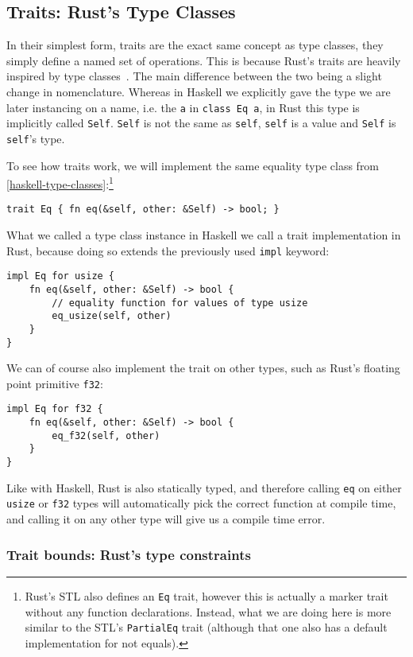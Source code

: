 \subsection{Traits: Rust's Type Classes}

In their simplest form, traits are the exact same concept as type classes, they simply define a named set of operations. This is because Rust's traits are heavily inspired by type classes~\cite{rust-reference}. The main difference between the two being a slight change in nomenclature. Whereas in Haskell we explicitly gave the type we are later instancing on a name, i.e. the \verb|a| in \verb|class Eq a|, in Rust this type is implicitly called \verb|Self|. \verb|Self| is not the same as \verb|self|, \verb|self| is a value and \verb|Self| is \verb|self|'s type.

To see how traits work, we will implement the same equality type class from \autoref{haskell-type-classes}:\footnote{Rust's STL also defines an \verb|Eq| trait, however this is actually a marker trait without any function declarations. Instead, what we are doing here is more similar to the STL's \verb|PartialEq| trait (although that one also has a default implementation for not equals).}
\begin{verbatim}
trait Eq { fn eq(&self, other: &Self) -> bool; }
\end{verbatim}
What we called a type class instance in Haskell we call a trait implementation in Rust, because doing so extends the previously used \verb|impl| keyword:
\begin{verbatim}
impl Eq for usize {
    fn eq(&self, other: &Self) -> bool {
        // equality function for values of type usize
        eq_usize(self, other)
    }
}
\end{verbatim}
We can of course also implement the trait on other types, such as Rust's floating point primitive \verb|f32|:
\begin{verbatim}
impl Eq for f32 {
    fn eq(&self, other: &Self) -> bool {
        eq_f32(self, other)
    }
}
\end{verbatim}

Like with Haskell, Rust is also statically typed, and therefore calling \verb|eq| on either \verb|usize| or \verb|f32| types will automatically pick the correct function at compile time, and calling it on any other type will give us a compile time error.

\subsubsection{Trait bounds: Rust's type constraints}

